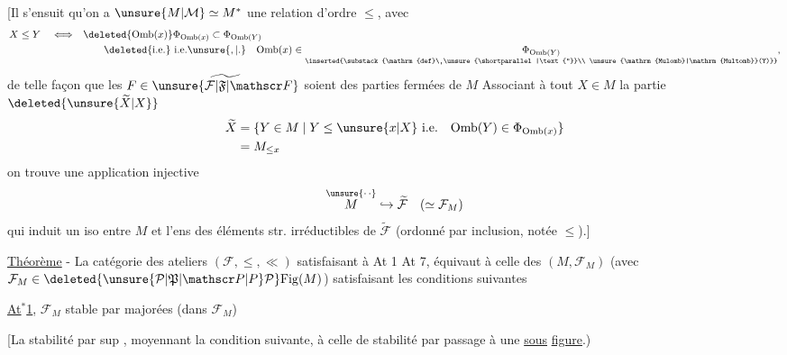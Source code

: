 [Il s'ensuit qu'on a  $\unsure{M|\mathcal M}\simeq M^{*}$ une relation d'ordre $\leq$, avec
\[
\begin{aligned}
 X\leq Y\quad\Longleftrightarrow\quad&
 \deleted{\mathrm{Omb}(x)}\Phi_{\mathrm{Omb}(x)}
 \subset\Phi_{\mathrm{Omb}(Y)}\\
 &\qquad\deleted{\text{i.e.}}\ \text{i.e.}\unsure{,|.}\quad
 \mathrm{Omb}(x)\in
 \underset{\inserted{\substack{\mathrm{def}\ \unsure{\shortparallel|\text{''}}\\
 \unsure{\mathrm{Mulomb}|\mathrm{Multomb}}(Y)}}}{\Phi_{\mathrm{Omb}(Y)}},
\end{aligned}
\]
de telle façon que les  $F\in\widetilde{\unsure{\mathcal F|\mathfrak F|\mathscr F}}$ soient des parties fermées de $M$
Associant à tout $X\in M$ la partie $\deleted{\unsure{\widetilde X|X}}$
\[
\begin{aligned}
 \widetilde X&=\{Y\in M\mid Y\leq\unsure{x|X}\ \text{i.e.}\quad
 \mathrm{Omb}(Y)\in\Phi_{\mathrm{Omb}(x)}\}\\
 &=M_{\leq x}
\end{aligned}
\]
on trouve une application injective
\[
 \overset{\unsure{\cdot\,\cdot}}{M}\hookrightarrow\widetilde{\mathcal F}\quad(\simeq\mathcal F_M)
\]
qui induit un iso entre $M$ et l'ens des éléments str. irréductibles de $\widetilde{\mathcal F}$ (ordonné par inclusion, notée $\leq$).]


\uline{Théorème} - \quad La catégorie  des  ateliers $(\mathcal F,\leq,\ll)$ satisfaisant à At 1  At 7, équivaut à celle des $(M,\mathcal F_M)$ (avec $\mathcal F_M\in\deleted{\unsure{\mathcal P|\mathfrak P|\mathscr P|P}\mathcal P}\mathrm{Fig}(M)$) satisfaisant les conditions suivantes

\uline{At$^{*}$1}, $\mathcal F_M$   stable par   majorées (dans $\mathcal F_M$)

 [La stabilité par sup , moyennant la condition suivante, à celle de  stabilité par passage à une \uline{sous}  \uline{figure}.)
\endgroup
